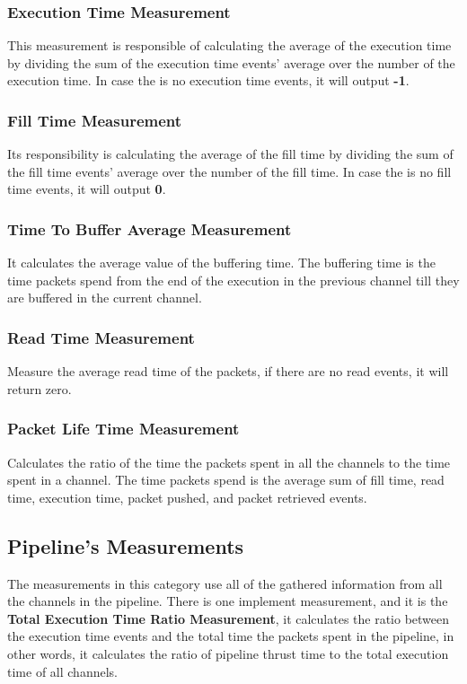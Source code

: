 \subsubsection{Execution Time Measurement}
This measurement is responsible of calculating the average of the execution time by dividing the sum
of the execution time events' average over the number of the execution time. In case the is no execution
time events, it will output \textbf{-1}.

\subsubsection{Fill Time Measurement}
Its responsibility is calculating the average of the fill time by dividing the sum
of the fill time events' average over the number of the fill time. In case the is no fill
time events, it will output \textbf{0}.

\subsubsection{Time To Buffer Average Measurement} \label{sec:time_to_buffer_average}
It calculates the average value of the buffering time. The buffering time is the time
packets spend from the end of the execution in the previous channel  
till they are buffered in the current channel.

\subsubsection{Read Time Measurement}
Measure the average read time of the packets, if there are no read events, it will return zero.

\subsubsection{Packet Life Time Measurement}
Calculates the ratio of the time the packets spent in all the channels to the time spent in a channel. 
The time packets spend is the average sum of fill time, read time, execution time, packet pushed, 
and packet retrieved events.

\subsection{Pipeline's Measurements}
The measurements in this category use all of the gathered information from all the channels in the pipeline.
There is one implement measurement, and it is the \textbf{Total Execution Time Ratio Measurement},
it calculates the ratio between the execution time events and the 
total time the packets spent in the pipeline, in other words, it calculates the ratio of pipeline thrust time to
the total execution time of all channels.

